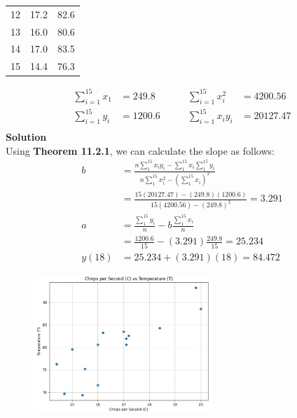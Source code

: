 \documentclass{uofa-eng-assignment}
\begin{document}
\begin{enumerate}
\begin{table}[ht]
\begin{tabular}{ccc}
                12              & 17.2                  & 82.6            \\
                13              & 16.0                  & 80.6            \\
                14              & 17.0                  & 83.5            \\
                15              & 14.4                  & 76.3            \\
                \hline
            \end{tabular}
        \end{table}
        \begin{align*}
            \sum_{i=1}^{15}x_1 & = 249.8 \qquad  & \sum_{i=1}^{15}x_i^2  & = 4200.56  \\
            \sum_{i=1}^{15}y_i & = 1200.6 \qquad & \sum_{i=1}^{15}x_iy_i & = 20127.47 \\
        \end{align*}
        \textbf{Solution} \\
        Using \textbf{Theorem 11.2.1}, we can calculate the slope as follows:
        \begin{align*}
            b     & = \frac{n\sum_{1}^{15}x_iy_i - \sum_{1}^{15}x_i\sum_{1}^{15}y_i}{n\sum_{1}^{15}x_i^2 - (\sum_{1}^{15}x_i)^2} \\
                  & = \frac{15(20127.47) - (249.8)(1200.6)}{15(4200.56) - (249.8)^2} = 3.291                                     \\
            a     & = \frac{\sum_{1}^{15}y_i}{n} - b\frac{\sum_{1}^{15}x_i}{n}                                                   \\
                  & = \frac{1200.6}{15} - (3.291)\frac{249.8}{15} = 25.234                                                       \\
            y(18) & = 25.234 + (3.291)(18) = 84.472
        \end{align*}
        \begin{figure}[h]
            \centering
            \includegraphics[width=0.6\textwidth]{11.2.1.png}

\end{figure}
\end{enumerate}
\end{document}
